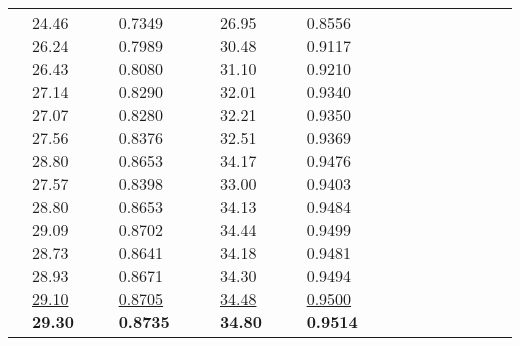 \documentclass[runningheads]{llncs}
\begin{document}
\begin{table}[!ht]
\begin{tabular}{|p{7em}|p{2.5em}|p{2.5em}|p{3em}|p{2.5em}|p{3em}|p{2.5em}|p{3em}|p{2.5em}|p{3em}|p{2.5em}|p{3em}|}
& 24.46 \newline{}26.24 \newline{}26.43 \newline{}27.14 \newline{}27.07 \newline{}27.56 \newline{}28.80 \newline{}27.57 \newline{}28.80 \newline{}29.09 \newline{}28.73 \newline{}28.93 \newline{}\underline{29.10} \newline{}\bfseries{29.30} & 0.7349 \newline{}0.7989 \newline{}0.8080 \newline{}0.8290 \newline{}0.8280 \newline{}0.8376 \newline{}0.8653 \newline{}0.8398 \newline{}0.8653 \newline{}0.8702 \newline{}0.8641 \newline{}0.8671 \newline{}\underline{0.8705} \newline{}\bfseries{0.8735} & 26.95 \newline{}30.48 \newline{}31.10 \newline{}32.01 \newline{}32.21 \newline{}32.51 \newline{}34.17 \newline{}33.00 \newline{}34.13 \newline{}34.44 \newline{}34.18 \newline{}34.30 \newline{}\underline{34.48} \newline{}\bfseries{34.80} & 0.8556 \newline{}0.9117 \newline{}0.9210 \newline{}0.9340 \newline{}0.9350 \newline{}0.9369 \newline{}0.9476 \newline{}0.9403 \newline{}0.9484 \newline{}0.9499 \newline{}0.9481 \newline{}0.9494 \newline{}\underline{0.9500} \newline{}\bfseries{0.9514}\\

\end{tabular}
\end{table}
\end{document}
